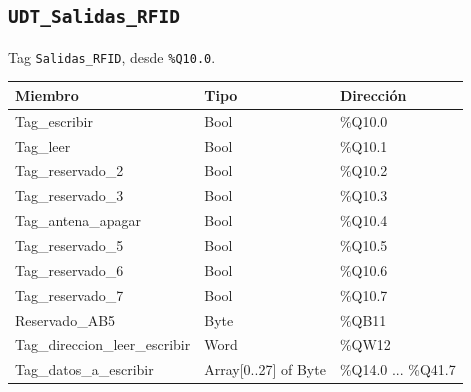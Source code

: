 \medskip
\subsection*{\texttt{UDT\_Salidas\_RFID}}
Tag \texttt{Salidas\_RFID}, desde \texttt{\%Q10.0}.\par\smallskip
\begin{tabular}{>{\ttfamily\small}p{5.2cm}>{\ttfamily\small}p{4.2cm}>{\ttfamily\small}p{2.4cm}}
\toprule
\textnormal{\textbf{Miembro}} & \textnormal{\textbf{Tipo}} & \textnormal{\textbf{Dirección}} \\
\midrule
Tag\_escribir & Bool & \%Q10.0 \\
Tag\_leer & Bool & \%Q10.1 \\
Tag\_reservado\_2 & Bool & \%Q10.2 \\
Tag\_reservado\_3 & Bool & \%Q10.3 \\
Tag\_antena\_apagar & Bool & \%Q10.4 \\
Tag\_reservado\_5 & Bool & \%Q10.5 \\
Tag\_reservado\_6 & Bool & \%Q10.6 \\
Tag\_reservado\_7 & Bool & \%Q10.7 \\
Reservado\_AB5 & Byte & \%QB11 \\
Tag\_direccion\_leer\_escribir & Word & \%QW12 \\
Tag\_datos\_a\_escribir & Array[0..27] of Byte & \%Q14.0 ... \%Q41.7 \\
\bottomrule
\end{tabular}

\medskip
